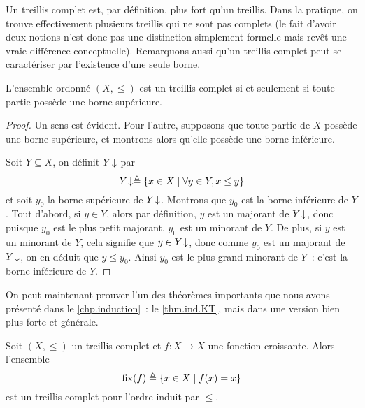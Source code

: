 Un treillis complet est, par définition, plus fort qu'un treillis. Dans la
pratique, on trouve effectivement plusieurs treillis qui ne sont pas complets
(le fait d'avoir deux notions n'est donc pas une distinction simplement formelle
mais revêt une vraie différence conceptuelle). Remarquons aussi qu'un treillis
complet peut se caractériser par l'existence d'une seule borne.

\begin{property}
  L'ensemble ordonné $(X,\leq)$ est un treillis complet si et seulement si toute
  partie possède une borne supérieure.
\end{property}

\begin{proof}
  Un sens est évident. Pour l'autre, supposons que toute partie de $X$ possède
  une borne supérieure, et montrons alors qu'elle possède une borne inférieure.

  Soit $Y\subseteq X$, on définit $Y\!\downarrow$ par
  \[Y\!\downarrow \triangleq \{x\in X \mid \forall y \in Y, x \leq y\}\]
  et soit $y_0$ la borne supérieure de $Y\!\downarrow$. Montrons que $y_0$ est la
  borne inférieure de $Y$. Tout d'abord, si $y\in Y$, alors par définition,
  $y$ est un majorant de $Y\!\downarrow$, donc puisque $y_0$ est le plus petit
  majorant, $y_0$ est un minorant de $Y$. De plus, si $y$ est un minorant
  de $Y$, cela signifie que $y\in Y\!\downarrow$, donc comme $y_0$ est un majorant
  de $Y\!\downarrow$, on en déduit que $y\leq y_0$. Ainsi $y_0$ est le plus grand
  minorant de $Y$~: c'est la borne inférieure de $Y$.
\end{proof}

On peut maintenant prouver l'un des théorèmes importants que nous avons présenté
dans le \cref{chp.induction}~: le \cref{thm.ind.KT}, mais dans une version bien
plus forte et générale.

\begin{theorem}
  Soit $(X,\leq)$ un treillis complet et $f : X \to X$ une fonction croissante.
  Alors l'ensemble
  \[\operatorname{fix}(f) \triangleq \{x\in X \mid f(x) = x\}\]
  est un treillis complet pour l'ordre induit par $\leq$.
\end{theorem}

